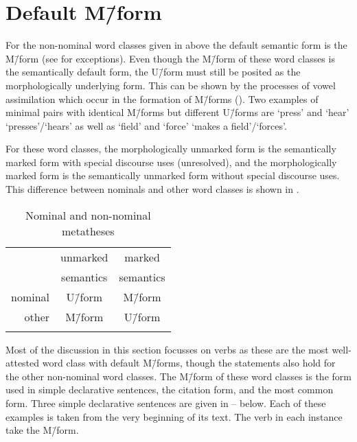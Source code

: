 \section{Default M\=/form}\label{sec:DefFor1}
For the non-nominal word classes given in  above
the default semantic form is the M\=/form
(see  for exceptions).
Even though the M\=/form of these word classes is the semantically default form,
the U\=/form must still be posited as the morphologically underlying form.
This can be shown by the processes of vowel assimilation which occur
in the formation of M\=/forms ().
Two examples of minimal pairs with identical M\=/forms but different U\=/forms are
 `press' and  `hear' {\ra}  `presses'/`hears'
as well as  `field' and  `force' {\ra}
 `makes a field'/`forces'.

For these word classes, the morphologically unmarked form
is the semantically marked form with special discourse uses (unresolved),
and the morphologically marked form is the semantically unmarked form without special discourse uses.
This difference between nominals and other word classes is shown in .

\begin{table}[h]
	\caption{Nominal and non-nominal metatheses}\label{tab:NomVerMet}
	\centering
		\begin{tabular}{rcc} \lsptoprule
							& unmarked	& marked\\
							& semantics	& semantics\\ \midrule
			nominal	& U\=/form		& M\=/form \\
			other		& M\=/form		& U\=/form \\ \lspbottomrule
		\end{tabular}
\end{table}

Most of the discussion in this section focusses on verbs
as these are the most well-attested word class with default M\=/forms,
though the statements also hold for the other non-nominal word classes.
The M\=/form of these word classes is the form
used in simple declarative sentences,
the citation form, and the most common form.
Three simple declarative sentences
are given in -- below.
Each of these examples is taken from the very beginning of its text.
The verb in each instance take the M\=/form.

